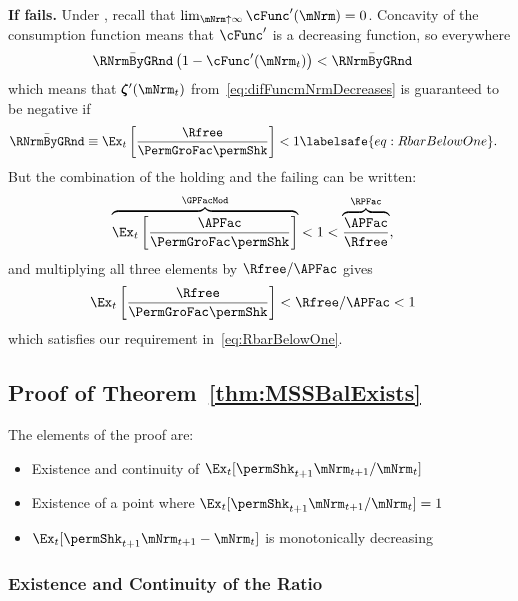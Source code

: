 \documentclass[\econtexRoot/BufferStockTheory]{subfiles}
\begin{document}

\textbf{If {\RIC} fails.}
Under \cncl{\RIC}, recall that $\lim_{\mNrm \uparrow \infty} \cFunc^{\prime}(\mNrm) = 0$.
Concavity of the consumption function means that $\cFunc^{\prime}$ is a decreasing function, so everywhere 
\begin{align*}
  \bar{\RNrmByGRnd}\left(1-\cFunc^{\prime}({\mNrm}_t)\right) & < \bar{\RNrmByGRnd}
\end{align*}
which means that $\difFunc^{\prime}(\mNrm_{t})$ from~\eqref{eq:difFuncmNrmDecreases} is guaranteed to be negative if
\begin{align}
  \bar{\RNrmByGRnd} \equiv \Ex_{t}\left[\frac{\Rfree}{\PermGroFac \permShk}\right] & < 1  \labelsafe{eq:RbarBelowOne}.
\end{align}
But the combination of the {\GICMod} holding and the {\RIC} failing can be written:
\begin{align*}
  \overbrace{\Ex_{t}\left[\frac{\APFac}{\PermGroFac \permShk}\right]}^{\GPFacMod} & < 1 < \overbrace{\frac{\APFac}{\Rfree}}^{{\RPFac}},
\end{align*}
and multiplying all three elements by $\Rfree/\APFac$ gives 
\begin{align*}
  \Ex_{t}\left[\frac{\Rfree}{\PermGroFac \permShk}\right] & < \Rfree/\APFac < 1
\end{align*}
which satisfies our requirement in~\eqref{eq:RbarBelowOne}.

  
\subsection{Proof of Theorem~\ref{thm:MSSBalExists}}
%

The elements of the proof are:
\begin{itemize}
\item Existence and continuity of $\Ex_{t}[\permShk_{t+1}\mNrm_{t+1}/\mNrm_t]$
\item Existence of a point where $\Ex_{t}[\permShk_{t+1}\mNrm_{t+1}/\mNrm_t] = 1$
\item $\Ex_{t}[\permShk_{t+1}\mNrm_{t+1}-\mNrm_{t}]$ is monotonically decreasing
\end{itemize}

\subsubsection{Existence and Continuity of the Ratio}%
\end{document}
